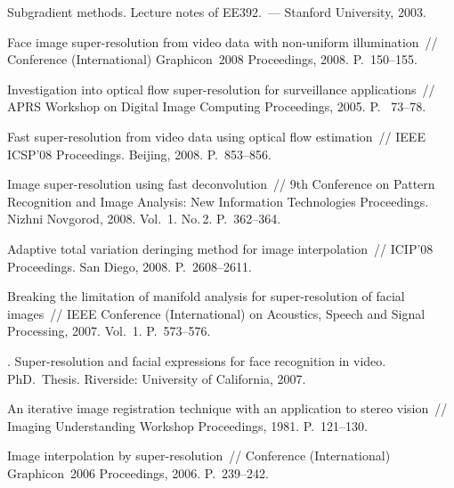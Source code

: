 \begin{multicols}{2}
{{\begin{thebibliography}{99}
Subgradient methods. Lecture notes of EE392.~--- Stanford 
University, 2003.

Face image super-resolution from video data with non-uniform illumination~//
Conference (International) Graphicon~2008 Proceedings, 2008. P.~150--155.

Investigation into optical flow super-resolution 
for surveillance applications~// APRS Workshop on Digital Image Computing Proceedings, 
2005. P.~ 73--78.

Fast super-resolution from video data using optical flow estimation~// 
IEEE ICSP'08 Proceedings. Beijing, 2008. P.~853--856.

Image super-resolution using fast deconvolution~// 
9th Conference on Pattern Recognition and Image Analysis: New Information Technologies Proceedings. Nizhni 
Novgorod, 2008. Vol.~1. No.\,2. P.~362--364.

Adaptive total variation deringing method for image interpolation~// 
ICIP'08 Proceedings. San Diego, 2008. P.~2608--2611.

Breaking the limitation of manifold analysis for super-resolution of facial images~//
IEEE  Conference (International) on Acoustics, Speech and Signal Processing, 2007.
Vol.~1. P.~573--576.

. 
Super-resolution and facial expressions for face recognition in video. PhD.\ Thesis. 
Riverside: University of California, 2007.

An iterative image registration technique with an application to stereo vision~// 
Imaging Understanding Workshop Proceedings, 1981. P.~121--130.

\label{end\stat}

Image interpolation by super-resolution~// Conference (International) 
Graphicon~2006 Proceedings, 2006. P.~239--242.

\end{thebibliography}
}
}
\end{multicols}  

 
 
 